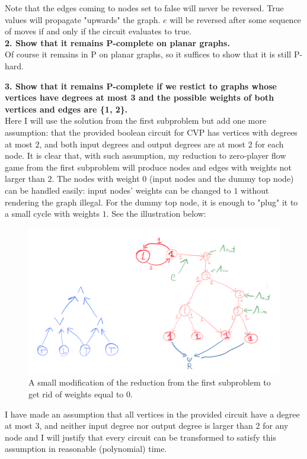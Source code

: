 Note that the edges coming to nodes set to false will never be reversed. True values will propagate
"upwards" the graph.
$e$ will be reversed after some sequence of moves if and only if the circuit evaluates to true.\\

\noindent
\textbf{2. Show that it remains P-complete on planar graphs.}\\
Of course it remains in P on planar graphs, so it suffices to show that it is still P-hard.

\textbf{
      3. Show that it remains P-complete if we restict to graphs whose vertices have
      degrees at most 3 and the possible weights of both vertices and edges are
      \{1, 2\}.
}\\
Here I will use the solution from the first subproblem but add one more assumption: that the provided
boolean circuit for CVP has vertices with degrees at most $2$, and both input degrees and output degrees
are at most 2 for each node.
It is clear that, with such assumption, my reduction to zero-player flow game from the first subproblem
will produce nodes and edges with weights not larger than $2$. The nodes with weight $0$ (input nodes
and the dummy top node) can be handled easily: input nodes' weights can be changed to $1$ without rendering
the graph illegal. For the dummy top node, it is enough to "plug" it to a small cycle with weights $1$.
See the illustration below:
\begin{figure}[H]
      \centering
      \caption{A small modification of the reduction from the first subproblem to get rid of weights equal to $0$.}
      \includegraphics[scale=0.2]{content/graphics/game16.png}
\end{figure}
I have made an assumption that all vertices in the provided circuit have a degree at most 3, and neither input degree
nor output degree is larger than 2 for any node and I will justify that every circuit can be transformed to satisfy this
assumption in reasonable (polynomial) time.

